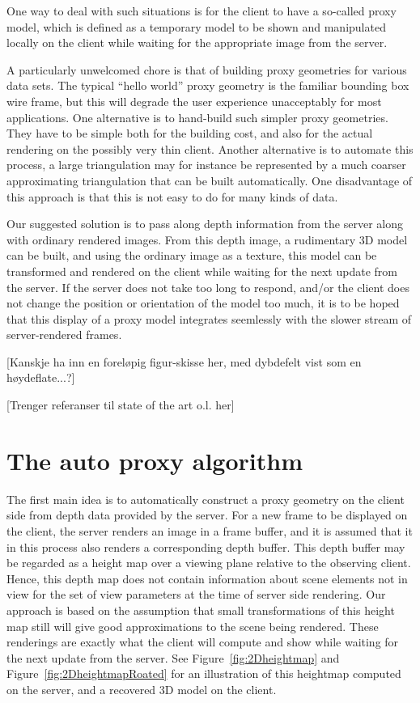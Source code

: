One way to deal with such situations is for the client to have a so-called proxy
model, which is defined as a temporary model to be shown and manipulated locally
on the client while waiting for the appropriate image from the server.

A particularly unwelcomed chore is that of building proxy geometries for various
data sets. The typical ``hello world'' proxy geometry is the familiar bounding
box wire frame, but this will degrade the user experience unacceptably for most
applications. One alternative is to hand-build such simpler proxy
geometries. They have to be simple both for the building cost, and also for the
actual rendering on the possibly very thin client. Another alternative is to
automate this process, a large triangulation may for instance be represented by
a much coarser approximating triangulation that can be built automatically. One
disadvantage of this approach is that this is not easy to do for many kinds of
data. 

Our suggested solution is to pass along depth information from the server along
with ordinary rendered images. From this depth image, a rudimentary 3D model can
be built, and using the ordinary image as a texture, this model can be
transformed and rendered on the client while waiting for the next update from
the server. If the server does not take too long to respond, and/or the client
does not change the position or orientation of the model too much, it is to be
hoped that this display of a proxy model integrates seemlessly with the slower
stream of server-rendered frames.

[Kanskje ha inn en foreløpig figur-skisse her, med dybdefelt vist som en
  høydeflate...?]

[Trenger referanser til state of the art o.l. her]


\section{The auto proxy algorithm}

The first main idea is to automatically construct a proxy geometry on the client
side from depth data provided by the server. For a new frame to be displayed on
the client, the server renders an image in a frame buffer, and it is assumed
that it in this process also renders a corresponding depth buffer. This depth
buffer may be regarded as a height map over a viewing plane relative to the
observing client. Hence, this depth map does not contain information about scene
elements not in view for the set of view parameters at the time of server side
rendering. Our approach is based on the assumption that small transformations of
this height map still will give good approximations to the scene being
rendered. These renderings are exactly what the client will compute and show
while waiting for the next update from the server. See
Figure~\ref{fig:2Dheightmap} and Figure~\ref{fig:2DheightmapRoated} for an
illustration of this heightmap computed on the server, and a recovered 3D model
on the client.

